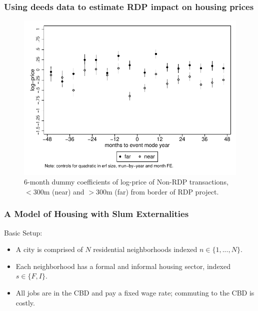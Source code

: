 \documentclass[aspectratio=149]{beamer}
\begin{document}

\begin{frame}
\frametitle{Using deeds data to estimate RDP impact on housing prices}

\begin{center}
\begin{figure}
\includegraphics[scale=0.65]{timereg_pm1.pdf}
\vspace{-3mm}
\caption{6-month dummy coefficients of log-price of Non-RDP transactions, $<$300m (near) and $>$300m (far) from border of RDP project.}
\end{figure}
\end{center}


\end{frame}




\begin{frame}
\frametitle{A Model of Housing with Slum Externalities}

Basic Setup:
\vspace{2mm}
\begin{itemize}
  \item A city is comprised of $N$ residential neighborhoods indexed $n\in\{1,...,N\}$. 
  \vspace{2mm}
  \item Each neighborhood has a formal and informal housing sector, indexed $s\in\{F,I\}$.
  \vspace{2mm}
  \item All jobs are in the CBD and pay a fixed wage rate; commuting to the CBD is costly.
\end{itemize}


\end{frame}
\end{document}
